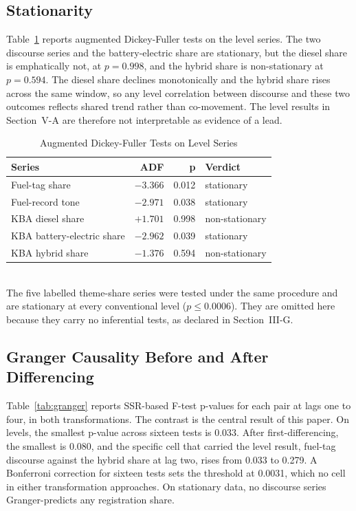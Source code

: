 \documentclass[conference]{IEEEtran}
\begin{document}
\subsection{Stationarity}
Table~\ref{tab:adf} reports augmented Dickey-Fuller tests on the level series.
The two discourse series and the battery-electric share are stationary, but the
diesel share is emphatically not, at $p=0.998$, and the hybrid share is
non-stationary at $p=0.594$. The diesel share declines monotonically and the
hybrid share rises across the same window, so any level correlation between
discourse and these two outcomes reflects shared trend rather than
co-movement. The level results in Section~V-A are therefore not interpretable
as evidence of a lead.

\begin{table}[t]
\caption{Augmented Dickey-Fuller Tests on Level Series}
\label{tab:adf}
\centering \small
\begin{tabular}{@{}lrrl@{}}
\toprule
\textbf{Series} & \textbf{ADF} & \textbf{p} & \textbf{Verdict} \\ \midrule
Fuel-tag share          & $-3.366$ & 0.012 & stationary \\
Fuel-record tone        & $-2.971$ & 0.038 & stationary \\
KBA diesel share        & $+1.701$ & 0.998 & non-stationary \\
KBA battery-electric share & $-2.962$ & 0.039 & stationary \\
KBA hybrid share        & $-1.376$ & 0.594 & non-stationary \\
\bottomrule
\end{tabular}
\\[2pt]
\footnotesize The five labelled theme-share series were tested under the same
procedure and are stationary at every conventional level ($p \le 0.0006$). They
are omitted here because they carry no inferential tests, as declared in
Section~III-G.
\end{table}

\subsection{Granger Causality Before and After Differencing}
Table~\ref{tab:granger} reports SSR-based F-test p-values for each pair at lags
one to four, in both transformations. The contrast is the central result of this
paper. On levels, the smallest p-value across sixteen tests is 0.033. After
first-differencing, the smallest is 0.080, and the specific cell that carried
the level result, fuel-tag discourse against the hybrid share at lag two, rises
from 0.033 to 0.279. A Bonferroni correction for sixteen tests sets the
threshold at 0.0031, which no cell in either transformation approaches. On
stationary data, no discourse series Granger-predicts any registration share.
\end{document}
